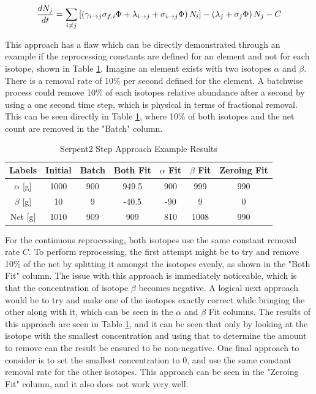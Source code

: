\begin{equation} \hfill
\frac{dN_j}{dt} = \sum_{i \neq j} \left [ \left( \gamma_{i \rightarrow j} \sigma_{f, i} \Phi + \lambda _{i \rightarrow j} + \sigma_{i \rightarrow j} \Phi \right) N_i \right ] - \left ( \lambda_j + \sigma_j \Phi \right ) N_j - C
\hfill\label{eq:Bateman_diff_second_example} \end{equation}

This approach has a flaw which can be directly demonstrated through an example if the reprocessing constants are defined for an element and not for each isotope, shown in Table \ref{tab:cont_repr_appr}. Imagine an element exists with two isotopes $\alpha$ and $\beta$. There is a removal rate of 10\% per second defined for the element. A batchwise process could remove 10\% of each isotopes relative abundance after a second by using a one second time step, which is physical in terms of fractional removal. This can be seen directly in Table \ref{tab:cont_repr_appr}, where 10\% of both isotopes and the net count are removed in the "Batch" column.

\begin{table}[ht]
\renewcommand{\arraystretch}{1.25}
\caption{Serpent2 Step Approach Example Results}
\label{tab:cont_repr_appr}
\begin{center}
\begin{tabular}{ c | c | c | c | c | c | c }
 \hline
 Labels & Initial & Batch & Both Fit & $\alpha$ Fit & $\beta$ Fit & Zeroing Fit\\
 \hline
 \hline
$\alpha$ [g] & 1000 & 900 & 949.5 & 900 & 999 & 990\\
$\beta$ [g] & 10 & 9 & -40.5 & -90 & 9 & 0\\
 \hline
 Net [g] & 1010 & 909 & 909 & 810 & 1008 & 990 \\
 \hline
\end{tabular}
\end{center}
\end{table}

For the continuous reprocessing, both isotopes use the same constant removal rate $C$. %
To perform reprocessing, the first attempt might be to try and remove 10\% of the net by splitting it amongst the isotopes evenly, as shown in the "Both Fit" column. The issue with this approach is immediately noticeable, which is that the concentration of isotope $\beta$ becomes negative. A logical next approach would be to try and make one of the isotopes exactly correct while bringing the other along with it, which can be seen in the $\alpha$ and $\beta$ Fit columns. The results of this approach are seen in Table \ref{tab:cont_repr_appr}, and it can be seen that only by looking at the isotope with the smallest concentration and using that to determine the amount to remove can the result be ensured to be non-negative. One final approach to consider is to set the smallest concentration to 0, and use the same constant removal rate for the other isotopes. This approach can be seen in the "Zeroing Fit" column, and it also does not work very well.

